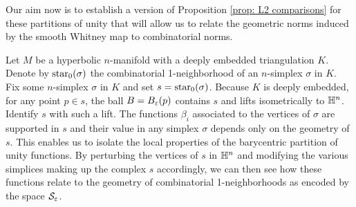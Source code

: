 Our aim now is to establish a version of Proposition \ref{prop: L2 comparisons} for these partitions of unity that will allow us to relate the geometric norms induced by the smooth Whitney map to combinatorial norms.


Let $M$ be a hyperbolic $n$-manifold with a deeply embedded triangulation $K$. Denote by $\operatorname{{\text{star}}}_0(\sigma)$ the combinatorial 1-neighborhood of an $n$-simplex $\sigma$ in $K$.
Fix some $n$-simplex $\sigma$ in $K$ and set $s = \operatorname{{\text{star}}}_0(\sigma)$. Because $K$ is deeply embedded, for any point $p\in s$, the ball $B = B_\varepsilon(p)$ contains $s$ and lifts isometrically to $\mathbb H^n$. Identify $s$ with such a lift. The functions $\beta_i$ associated to the vertices of $\sigma$ are supported in $s$ and their value in any simplex $\sigma$ depends only on the geometry of $s$. This enables us to isolate the local properties of the barycentric partition of unity functions.
By perturbing the vertices of $s$ in $\mathbb H^n$ and modifying the various simplices making up the complex $s$ accordingly, we can then see how these functions relate to the geometry of combinatorial 1-neighborhoods as encoded by the space $\mathcal S_\varepsilon$.

